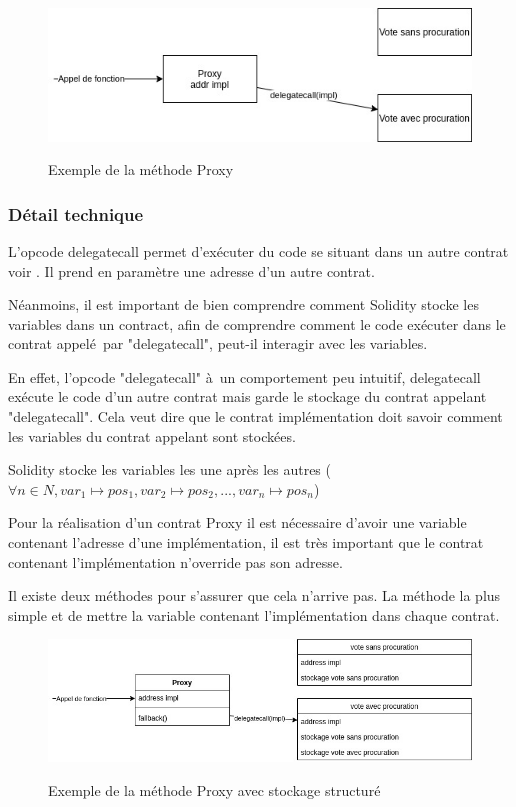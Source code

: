 \begin{figure}
  \caption{Exemple de la méthode Proxy}
  \includegraphics[scale=0.6]{proxy.jpg}
  \centering 
  \label{fig:proxy}
\end{figure}

\subsubsection{Détail technique}
L'opcode delegatecall permet d'exécuter du code se situant dans un autre contrat voir \pageref{fig:proxy}. 
Il prend en paramètre une adresse d'un autre contrat.

Néanmoins, il est important de bien comprendre comment Solidity stocke les variables dans un contract, afin de 
comprendre comment le code exécuter dans le contrat appelé par "delegatecall", peut-il interagir avec les variables.

En effet, l'opcode "delegatecall" à un comportement peu intuitif, delegatecall exécute le code d'un autre contrat
mais garde le stockage du contrat appelant "delegatecall". Cela veut dire que le contrat implémentation doit savoir comment 
les variables du contrat appelant sont stockées.

Solidity stocke les variables les une après les autres ($\forall n \in N, var_1 \mapsto pos_1, var_2 \mapsto pos_2,
..., var_n \mapsto pos_n$)

Pour la réalisation d'un contrat Proxy il est nécessaire d'avoir une variable contenant l'adresse d'une implémentation,
il est très important que le contrat contenant l'implémentation n'override pas son adresse.

Il existe deux méthodes pour s'assurer que cela n'arrive pas. La méthode la plus simple et de mettre la variable contenant
l'implémentation dans chaque contrat. 

\begin{figure}[h!]
  \caption{Exemple de la méthode Proxy avec stockage structuré}
  \includegraphics[scale=0.5]{proxy_structured_stockage.jpg}
  \centering 
  \label{fig:proxy_structuré}
\end{figure}

